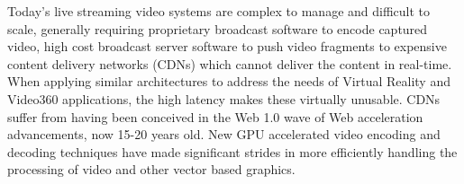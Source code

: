 Today’s live streaming video systems are complex to manage and difficult to scale, generally requiring proprietary broadcast software to encode captured video, high cost broadcast server software to push video fragments to expensive content delivery networks (CDNs) which cannot deliver the content in real-time.  When applying similar architectures to address the needs of Virtual Reality and Video360 applications, the high latency makes these virtually unusable.  CDNs suffer from having been conceived in the Web 1.0 wave of Web acceleration advancements, now 15-20 years old.  New GPU accelerated video encoding and decoding techniques have made significant strides in more efficiently handling the processing of video and other vector based graphics.  


